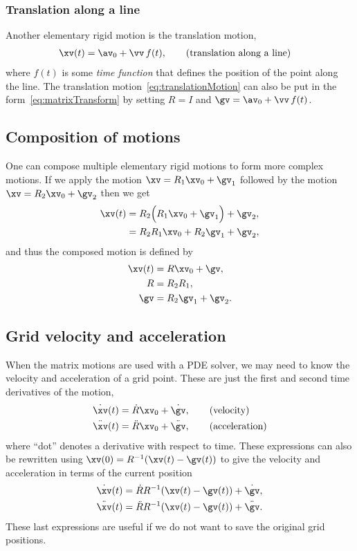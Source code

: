 \subsubsection{Translation along a line}
Another elementary rigid motion is the translation motion,
\begin{align}
  \xv(t) &= \av_0 + \vv\, f(t), \qquad\text{(translation along a line)} \label{eq:translationMotion}
\end{align}
where $f(t)$ is some {\em time function} that defines the position of the point along the line. The
translation motion~\eqref{eq:translationMotion} can also be put in the form~\eqref{eq:matrixTransform}
by setting $R=I$ and $\gv=\av_0 + \vv\, f(t)$. 

\subsection{Composition of motions}

One can compose multiple elementary rigid motions to form more complex motions.
If we apply the motion $\xv = R_1 \xv_0 + \gv_1$ followed by the motion $\xv = R_2 \xv_0 + \gv_2$
then we get
\begin{align}
  \xv(t) &= R_2 \Big( R_1 \xv_0 + \gv_1 \Big) + \gv_2, \\
         &= R_2 R_1 \xv_0 + R_2\gv_1 + \gv_2 ,
\end{align}
and thus the composed motion is defined by 
\begin{align}
  \xv(t) &= R \xv_0 + \gv, \\
     R    &= R_2 R_1 , \\
     \gv &= R_2\gv_1 + \gv_2. 
\end{align}

\subsection{Grid velocity and acceleration}

When the matrix motions are used with a PDE solver, we may need to know the velocity and
acceleration of a grid point. These are just the first and second time derivatives of the
motion, 
\begin{align}
  \dot{\xv}(t) &= \dot{R} \xv_0 + \dot{\gv}, \qquad\text{(velocity)} \\
  \ddot{\xv}(t) &= \ddot{R} \xv_0 + \ddot{\gv}, \qquad\text{(acceleration)}
\end{align}
where ``dot'' denotes a derivative with respect to time. 
These expressions can also be rewritten using $\xv(0) = R^{-1}(\xv(t)-\gv(t))$
to give the velocity and acceleration in terms of the current position
\begin{align}
  \dot{\xv}(t) &= \dot{R}R^{-1}(\xv(t)-\gv(t)) + \dot{\gv}, \\
  \ddot{\xv}(t) &= \ddot{R}R^{-1}(\xv(t)-\gv(t))+ \ddot{\gv}. 
\end{align}
These last expressions are useful if we do not want to save the original grid positions. 

